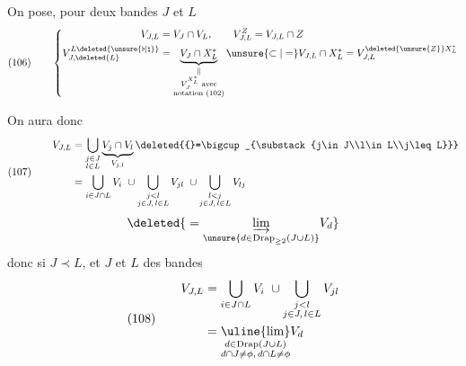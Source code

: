 On pose, pour deux bandes $J$ et $L$
\[
(106)\qquad\left\{\begin{aligned}
V_{J,L}&=V_J\cap V_L,\qquad V_{J,L}^Z=V_{J,L}\cap Z\\
V_{J,\deleted{L}}^{L\deleted{\unsure{\flat|\natural}}}
&=\underbrace{V_J\cap X_L^*}_{\substack{\Vert\\V_J^{X_L^*}\text{ avec}\\\text{notation }(102)}}
\unsure{\subset|=}V_{J,L}\cap X_L^*
=V_{J,L}^{\deleted{\unsure{Z}}X_L^*}
\end{aligned}\right.
\]

On aura donc
\[
(107)\qquad\begin{aligned}
V_{J,L}&=\bigcup_{\substack{j\in J\\l\in L}}
\underbrace{V_j\cap V_l}_{V_{j,l}}
\deleted{{}=\bigcup_{\substack{j\in J\\l\in L\\j\leq L}}}\\
&=\bigcup_{i\in J\cap L}V_i\ \cup
\bigcup_{\substack{j<l\\j\in J,\,l\in L}}V_{jl}\ \cup
\bigcup_{\substack{l<j\\j\in J,\,l\in L}}V_{lj}
\end{aligned}
\]
\[
\deleted{{}=\underset{\unsure{d\in\mathrm{Drap}_{\geq2}(J\cup L)}}{\varinjlim}V_d}
\]
donc si $J\prec L$, et $J$ et $L$ des bandes
\[
(108)\qquad\begin{aligned}
V_{J,L}&=\bigcup_{i\in J\cap L}V_i\ \cup
\bigcup_{\substack{j<l\\j\in J,\,l\in L}}V_{jl}\\
&=\underset{\substack{d\in\mathrm{Drap}(J\cup L)\\d\cap J\ne\phi,\,d\cap L\ne\phi}}{\uline{\lim}}V_d
\end{aligned}
\]

